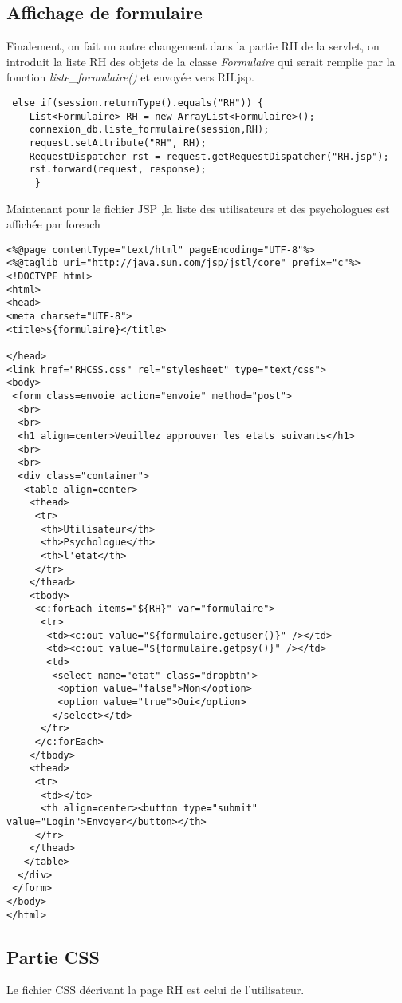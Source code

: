 \documentclass[12]{article}
\begin{document}
\subsection{Affichage de formulaire}

Finalement, on fait un autre changement dans la partie RH de la servlet, on introduit la liste RH des objets de la classe \textit{Formulaire} qui serait remplie par la fonction \textit{liste\_formulaire()} et envoyée vers RH.jsp.

\lstset{language=java}
\begin{lstlisting}
 else if(session.returnType().equals("RH")) {
	List<Formulaire> RH = new ArrayList<Formulaire>();
	connexion_db.liste_formulaire(session,RH);
	request.setAttribute("RH", RH);
	RequestDispatcher rst = request.getRequestDispatcher("RH.jsp");
	rst.forward(request, response);
     }
\end{lstlisting}
 Maintenant pour le fichier JSP ,la liste des utilisateurs et des psychologues est affichée par foreach
\lstset{language=java}
\begin{lstlisting}
<%@page contentType="text/html" pageEncoding="UTF-8"%>
<%@taglib uri="http://java.sun.com/jsp/jstl/core" prefix="c"%>
<!DOCTYPE html>
<html>
<head>
<meta charset="UTF-8">
<title>${formulaire}</title>

</head>
<link href="RHCSS.css" rel="stylesheet" type="text/css">
<body>
 <form class=envoie action="envoie" method="post">
  <br>
  <br>
  <h1 align=center>Veuillez approuver les etats suivants</h1>
  <br>
  <br>
  <div class="container">
   <table align=center>
    <thead>
     <tr>
      <th>Utilisateur</th>
      <th>Psychologue</th>
      <th>l'etat</th>
     </tr>
    </thead>
    <tbody>
     <c:forEach items="${RH}" var="formulaire">
      <tr>
       <td><c:out value="${formulaire.getuser()}" /></td>
       <td><c:out value="${formulaire.getpsy()}" /></td>
       <td>
        <select name="etat" class="dropbtn">
         <option value="false">Non</option>
         <option value="true">Oui</option>
        </select></td>
      </tr>
     </c:forEach>
    </tbody>
    <thead>
     <tr>
      <td></td>
      <th align=center><button type="submit" value="Login">Envoyer</button></th>
     </tr>
    </thead>
   </table>
  </div>
 </form>
</body>
</html>

\end{lstlisting}
 
\subsection{Partie CSS}
Le fichier CSS décrivant la page RH est celui de l'utilisateur.
\end{document}
